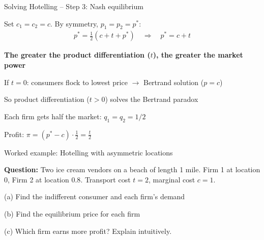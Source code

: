 \documentclass[notes,11pt, aspectratio=169]{beamer}
\newenvironment{wideitemize}{\itemize\addtolength{\itemsep}{10pt}}{\enditemize}
\begin{document}
\begin{frame}{Solving Hotelling -- Step 3: Nash equilibrium}
	\begin{wideitemize}
		\item Set $c_1=c_2=c$. By symmetry, $p_1=p_2=p^*$:
		\begin{align*}
			p^* = \frac{1}{2}(c+t+p^*) \quad \Rightarrow \quad p^* = c+t
		\end{align*}
		\item \textbf{The greater the product differentiation ($t$), the greater the market power}
		\item If $t=0$: consumers flock to lowest price $\rightarrow$ Bertrand solution ($p=c$)
		\item So product differentiation ($t>0$) solves the Bertrand paradox
		\item Each firm gets half the market: $q_1 = q_2 = 1/2$
		\item Profit: $\pi = (p^* - c) \cdot \frac{1}{2} = \frac{t}{2}$
	\end{wideitemize}
\end{frame}

\begin{frame}{Worked example: Hotelling with asymmetric locations}
	\begin{wideitemize}
		\item \textbf{Question:} Two ice cream vendors on a beach of length 1 mile. Firm 1 at location $0$, Firm 2 at location $0.8$. Transport cost $t = 2$, marginal cost $c = 1$.
		\item (a) Find the indifferent consumer and each firm's demand
		\item (b) Find the equilibrium price for each firm
		\item (c) Which firm earns more profit? Explain intuitively.
	\end{wideitemize}
\end{frame}
\end{document}
